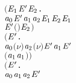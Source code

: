 \begin{itemize}
\begin{alltt}
       \ensuremath{(}\HOLSymConst{\HOLTokenExists{}}  \ensuremath{\HOLBoundVar{E}\sb{\mathrm{1}}} \ensuremath{\HOLBoundVar{E}\sp{\prime}} \ensuremath{\HOLBoundVar{E}\sb{\mathrm{2}}}.
            \ensuremath{\HOLBoundVar{a}\sb{\mathrm{0}}} \HOLSymConst{\ensuremath{=}}  \HOLSymConst{\ensuremath{\mid}} \ensuremath{\HOLBoundVar{E}\sp{\prime}} \HOLSymConst{\HOLTokenConj{}} \ensuremath{\HOLBoundVar{a}\sb{\mathrm{1}}} \HOLSymConst{\ensuremath{=}} \HOLSymConst{\ensuremath{\tau}} \HOLSymConst{\HOLTokenConj{}} \ensuremath{\HOLBoundVar{a}\sb{\mathrm{2}}} \HOLSymConst{\ensuremath{=}} \ensuremath{\HOLBoundVar{E}\sb{\mathrm{1}}} \HOLSymConst{\ensuremath{\mid}} \ensuremath{\HOLBoundVar{E}\sb{\mathrm{2}}} \HOLSymConst{\HOLTokenConj{}}  \HOLTokenTransBegin{} \HOLTokenTransEnd \ensuremath{\HOLBoundVar{E}\sb{\mathrm{1}}} \HOLSymConst{\HOLTokenConj{}}
            \ensuremath{\HOLBoundVar{E}\sp{\prime}} \HOLTokenTransBegin{} \ensuremath{(} \ensuremath{)}\HOLTokenTransEnd \ensuremath{\HOLBoundVar{E}\sb{\mathrm{2}}}\ensuremath{)} \HOLSymConst{\HOLTokenDisj{}}
       \ensuremath{(}\HOLSymConst{\HOLTokenExists{}} \ensuremath{\HOLBoundVar{E}\sp{\prime}}  .
            \ensuremath{\HOLBoundVar{a}\sb{\mathrm{0}}} \HOLSymConst{\ensuremath{=}} \ensuremath{(\nu}\ensuremath{)}  \HOLSymConst{\HOLTokenConj{}} \ensuremath{\HOLBoundVar{a}\sb{\mathrm{2}}} \HOLSymConst{\ensuremath{=}} \ensuremath{(\nu}\ensuremath{)} \ensuremath{\HOLBoundVar{E}\sp{\prime}} \HOLSymConst{\HOLTokenConj{}}  \HOLTokenTransBegin\ensuremath{\HOLBoundVar{a}\sb{\mathrm{1}}}\HOLTokenTransEnd \ensuremath{\HOLBoundVar{E}\sp{\prime}} \HOLSymConst{\HOLTokenConj{}}
            \ensuremath{(}\ensuremath{\HOLBoundVar{a}\sb{\mathrm{1}}} \HOLSymConst{\ensuremath{=}} \HOLSymConst{\ensuremath{\tau}} \HOLSymConst{\HOLTokenDisj{}} \ensuremath{\HOLBoundVar{a}\sb{\mathrm{1}}} \HOLSymConst{\ensuremath{=}}   \HOLSymConst{\HOLTokenConj{}}  \HOLSymConst{\HOLTokenNotIn{}}  \HOLSymConst{\HOLTokenConj{}}   \HOLSymConst{\HOLTokenNotIn{}} \ensuremath{)}\ensuremath{)} \HOLSymConst{\HOLTokenDisj{}}
       \ensuremath{(}\HOLSymConst{\HOLTokenExists{}}  \ensuremath{\HOLBoundVar{E}\sp{\prime}} .
            \ensuremath{\HOLBoundVar{a}\sb{\mathrm{0}}} \HOLSymConst{\ensuremath{=}}    \HOLSymConst{\HOLTokenConj{}} \ensuremath{\HOLBoundVar{a}\sb{\mathrm{1}}} \HOLSymConst{\ensuremath{=}}    \HOLSymConst{\HOLTokenConj{}} \ensuremath{\HOLBoundVar{a}\sb{\mathrm{2}}} \HOLSymConst{\ensuremath{=}}  \ensuremath{\HOLBoundVar{E}\sp{\prime}}  \HOLSymConst{\HOLTokenConj{}}

\end{alltt}
\end{itemize}
